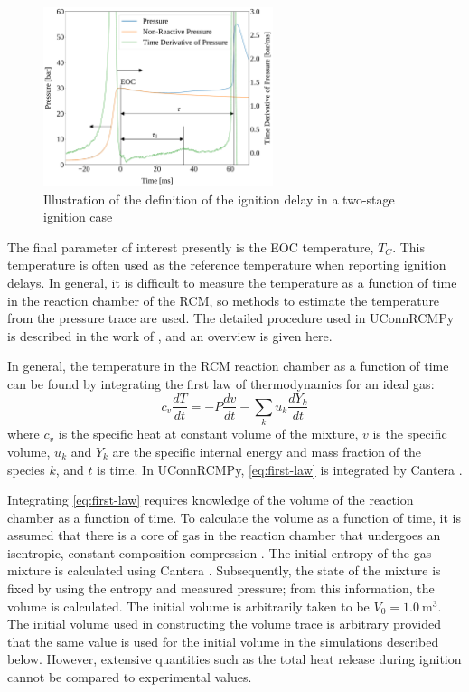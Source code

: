 \documentclass[12pt]{../ussci}
\begin{document}
\begin{figure}[htbp]
    \centering
    \includegraphics[width=0.6\textwidth]{figures/ign-delay-def.pdf}
    \caption{Illustration of the definition of the ignition delay in a
    two-stage ignition case}
    \label{fig:ign-delay-def}
\end{figure}

The final parameter of interest presently is the EOC temperature,
\(T_C\). This temperature is often used as the reference temperature
when reporting ignition delays. In general, it is difficult to measure
the temperature as a function of time in the reaction chamber of the
RCM, so methods to estimate the temperature from the pressure trace are
used. The detailed procedure used in UConnRCMPy is described in the work
of \textcite{Dames2016}, and an overview is given here.

In general, the temperature in the RCM reaction chamber as a function of
time can be found by integrating the first law of thermodynamics for an
ideal gas:
%
\begin{equation} \label{eq:first-law}
    c_v \frac{dT}{dt} = -P \frac{dv}{dt} - \sum_k u_k \frac{d Y_k}{dt}
\end{equation}
%
where \(c_v\) is the specific heat at constant volume of the mixture,
\(v\) is the specific volume, \(u_k\) and \(Y_k\) are the specific
internal energy and mass fraction of the species \(k\), and \(t\) is
time. In UConnRCMPy, \cref{eq:first-law} is integrated by Cantera
\autocite{cantera}.

Integrating \cref{eq:first-law} requires knowledge of the volume of the reaction
chamber as a function of time. To calculate the volume as a function of time, it
is assumed that there is a core of gas in the reaction chamber that undergoes an
isentropic, constant composition compression \autocite{Lee1998}. The initial
entropy of the gas mixture is calculated using Cantera \autocite{cantera}.
Subsequently, the state of the mixture is fixed by using the entropy and
measured pressure; from this information, the volume is calculated. The initial
volume is arbitrarily taken to be \(V_0=\SI{1.0}{\m\cubed}\). The initial volume
used in constructing the volume trace is arbitrary provided that the same value
is used for the initial volume in the simulations described below. However,
extensive quantities such as the total heat release during ignition cannot be
compared to experimental values.
\end{document}
